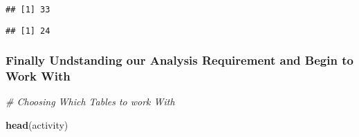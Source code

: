 \documentclass[
]{article}
\newenvironment{Shaded}{\begin{snugshade}}{\end{snugshade}}
\newcommand{\CommentTok}[1]{\textcolor[rgb]{0.56,0.35,0.01}{\textit{#1}}}
\newcommand{\FunctionTok}[1]{\textcolor[rgb]{0.13,0.29,0.53}{\textbf{#1}}}
\newcommand{\NormalTok}[1]{#1}
\newcommand{\SpecialCharTok}[1]{\textcolor[rgb]{0.81,0.36,0.00}{\textbf{#1}}}
\begin{document}
\begin{verbatim}
## [1] 33
\end{verbatim}

\begin{Shaded}
\end{Shaded}

\begin{verbatim}
## [1] 24
\end{verbatim}

\subsubsection{Finally Undstanding our Analysis Requirement and Begin to
Work
With}\label{finally-undstanding-our-analysis-requirement-and-begin-to-work-with}

\begin{Shaded}
\begin{Highlighting}[]
\CommentTok{\# Choosing Which Tables to work With}

\FunctionTok{head}\NormalTok{(activity)}
\end{Highlighting}
\end{Shaded}
\end{document}
